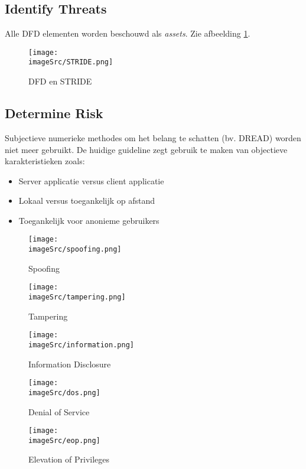 \documentclass[../main.tex]{subfiles}
\begin{document}
\subsection{Identify Threats}
Alle DFD elementen worden beschouwd als \textit{assets}. Zie afbeelding \ref{f:STRIDE}.
\begin{figure}[h!]
    \centering
    \texttt{[image: \\imageSrc/STRIDE.png]}
    \caption{DFD en STRIDE}
    \label{f:STRIDE}
\end{figure}
\subsection{Determine Risk}
Subjectieve numerieke methodes om het belang te schatten (bv. DREAD) worden niet meer gebruikt. De huidige guideline zegt gebruik te maken van objectieve karakteristieken zoals:
\begin{itemize}
	\item Server applicatie versus client applicatie
	\item Lokaal versus toegankelijk op afstand
	\item Toegankelijk voor anonieme gebruikers
\end{itemize}

\begin{figure}[h!]
    \centering
    \texttt{[image: \\imageSrc/spoofing.png]}
    \caption{Spoofing}
    \label{spoofing}
\end{figure}

\begin{figure}[h!]
    \centering
    \texttt{[image: \\imageSrc/tampering.png]}
    \caption{Tampering}
    \label{tampering}
\end{figure}
    
\begin{figure}[h!]
    \centering
    \texttt{[image: \\imageSrc/information.png]}
    \caption{Information Disclosure}
    \label{information}
\end{figure}
    
\begin{figure}[h!]
    \centering
    \texttt{[image: \\imageSrc/dos.png]}
    \caption{Denial of Service}
    \label{dos}
\end{figure}
    
\begin{figure}[h!]
    \centering
    \texttt{[image: \\imageSrc/eop.png]}
    \caption{Elevation of Privileges}
    \label{eop}
\end{figure}
\end{document}
